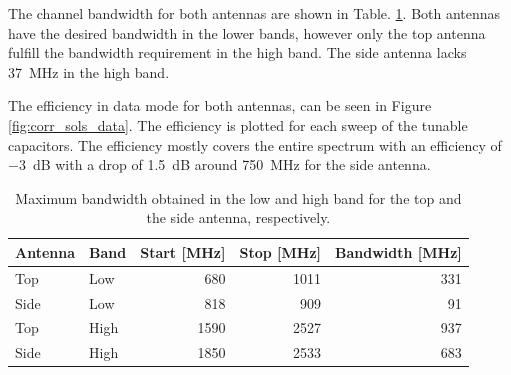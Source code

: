 The channel bandwidth for both antennas are shown in Table. \ref{tab:bw_sol1}. Both antennas have the desired bandwidth in the lower bands, however only the top antenna fulfill the bandwidth requirement in the high band. The side antenna lacks \SI{37}{MHz} in the high band.

The efficiency in data mode for both antennas, can be seen in Figure \ref{fig:corr_sols_data}. The efficiency is plotted for each sweep of the tunable capacitors. The efficiency mostly covers the entire spectrum with an efficiency of \SI{-3}{dB} with a drop of \SI{1.5}{dB} around \SI{750}{MHz} for the side antenna. 

    \begin{table}
        \centering
        \begin{tabular}{|l|l|r|r|r|}
            \hline
            Antenna & Band & Start [MHz] & Stop [MHz] & Bandwidth [MHz] \\
            \hline
            Top     & Low  & 680         & 1011       & 331 \\
            Side    & Low  & 818         & 909        & 91 \\
            \hline
            Top     & High & 1590        & 2527       & 937 \\
            Side    & High & 1850        & 2533       & 683 \\
            \hline
        \end{tabular}
        \caption{Maximum bandwidth obtained in the low and high band for the top and the side antenna, respectively.}
        \label{tab:bw_sol1}
    \end{table}

